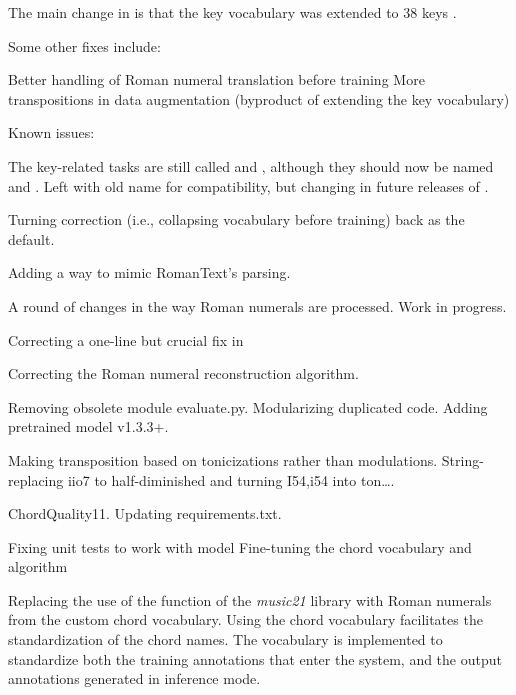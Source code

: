 The main change in  is that the key vocabulary
was extended to 38 keys .

Some other fixes include:

Better handling of Roman numeral translation before training
More transpositions in data augmentation (byproduct of
extending the key vocabulary)

Known issues:

The key-related tasks are still called  and
 , although they should now be named
  and . Left with old
 name for compatibility, but changing in future releases of
 .

Turning correction (i.e., collapsing vocabulary before
training) back as the default.

Adding a way to mimic RomanText's parsing.

A round of changes in the way Roman numerals are processed.
Work in progress.

Correcting a one-line but crucial fix in 

Correcting the Roman numeral reconstruction algorithm.

Removing obsolete module evaluate.py. Modularizing
duplicated code. Adding pretrained model v1.3.3+.

Making transposition based on tonicizations rather than
modulations. String-replacing iio7 to half-diminished and
turning I54,i54 into ton….

ChordQuality11. Updating requirements.txt.

Fixing unit tests to work with  model
Fine-tuning the chord vocabulary and
 algorithm

Replacing the use of the 
function of the \emph{music21}
\parencite{cuthbert2010music21} library with Roman numerals
from the custom chord vocabulary. Using the chord vocabulary
facilitates the standardization of the chord names. The
vocabulary is implemented to standardize both the training
annotations that enter the system, and the output
annotations generated in inference mode.

